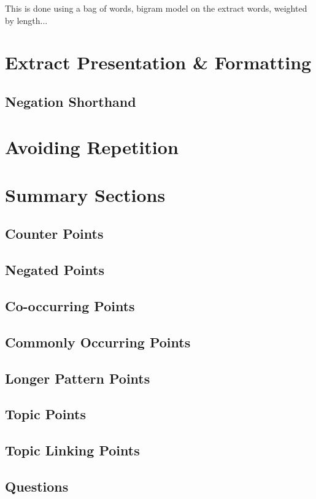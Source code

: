     This is done using a bag of words, bigram model on the extract words, weighted by length...

  \section{Extract Presentation \& Formatting}
    \subsection{Negation Shorthand}
  \section{Avoiding Repetition}
  \section{Summary Sections}
    \subsection{Counter Points}
    \subsection{Negated Points}
    \subsection{Co-occurring Points}
    \subsection{Commonly Occurring Points}
    \subsection{Longer Pattern Points}
    \subsection{Topic Points}
    \subsection{Topic Linking Points}
    \subsection{Questions}
